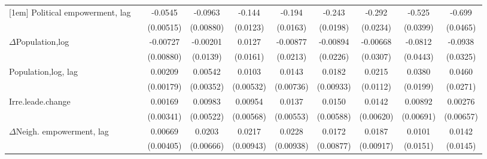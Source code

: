 \begin{table}[htbp]
\begin{tabular}{l*{9}{c}}
[1em]
Political empowerment, lag   &                     &     -0.0545\sym{***}&     -0.0963\sym{***}&      -0.144\sym{***}&      -0.194\sym{***}&      -0.243\sym{***}&      -0.292\sym{***}&      -0.525\sym{***}&      -0.699\sym{***}\\
                    &                     &   (0.00515)         &   (0.00880)         &    (0.0123)         &    (0.0163)         &    (0.0198)         &    (0.0234)         &    (0.0399)         &    (0.0465)         \\
[1em]
$\Delta$Population,log               &                     &    -0.00727         &    -0.00201         &      0.0127         &    -0.00877         &    -0.00894         &    -0.00668         &     -0.0812\sym{*}  &     -0.0938\sym{***}\\
                    &                     &   (0.00880)         &    (0.0139)         &    (0.0161)         &    (0.0213)         &    (0.0226)         &    (0.0307)         &    (0.0443)         &    (0.0325)         \\
[1em]
Population,log, lag              &                     &     0.00209         &     0.00542         &      0.0103\sym{*}  &      0.0143\sym{*}  &      0.0182\sym{*}  &      0.0215\sym{*}  &      0.0380\sym{*}  &      0.0460\sym{*}  \\
                    &                     &   (0.00179)         &   (0.00352)         &   (0.00532)         &   (0.00736)         &   (0.00933)         &    (0.0112)         &    (0.0199)         &    (0.0271)         \\
[1em]
Irre.leade.change        &                     &     0.00169         &     0.00983\sym{*}  &     0.00954\sym{*}  &      0.0137\sym{**} &      0.0150\sym{**} &      0.0142\sym{**} &     0.00892         &     0.00276         \\
                    &                     &   (0.00341)         &   (0.00522)         &   (0.00568)         &   (0.00553)         &   (0.00588)         &   (0.00620)         &   (0.00691)         &   (0.00657)         \\
[1em]
$\Delta$Neigh. empowerment, lag&                     &     0.00669         &      0.0203\sym{***}&      0.0217\sym{**} &      0.0228\sym{**} &      0.0172\sym{*}  &      0.0187\sym{**} &      0.0101         &      0.0142         \\
                    &                     &   (0.00405)         &   (0.00666)         &   (0.00943)         &   (0.00938)         &   (0.00877)         &   (0.00917)         &    (0.0151)         &    (0.0145)         \\

\end{tabular}
\end{table}
